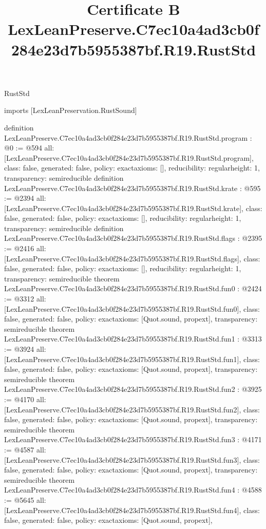 \begin{lexlean}{RustStd}
\title{Certificate B LexLeanPreserve.C7ec10a4ad3cb0f284e23d7b5955387bf.R19.RustStd}
\begin{coremodule}
imports [LexLeanPreservation.RustSound]

definition LexLeanPreserve.C7ec10a4ad3cb0f284e23d7b5955387bf.R19.RustStd.program : @0 := @594 {
  all: [LexLeanPreserve.C7ec10a4ad3cb0f284e23d7b5955387bf.R19.RustStd.program],
  class: false,
  generated: false,
  policy: exact{axioms: []},
  reducibility: regular{height: 1},
  transparency: semireducible
}
definition LexLeanPreserve.C7ec10a4ad3cb0f284e23d7b5955387bf.R19.RustStd.krate : @595 := @2394 {
  all: [LexLeanPreserve.C7ec10a4ad3cb0f284e23d7b5955387bf.R19.RustStd.krate],
  class: false,
  generated: false,
  policy: exact{axioms: []},
  reducibility: regular{height: 1},
  transparency: semireducible
}
definition LexLeanPreserve.C7ec10a4ad3cb0f284e23d7b5955387bf.R19.RustStd.flags : @2395 := @2416 {
  all: [LexLeanPreserve.C7ec10a4ad3cb0f284e23d7b5955387bf.R19.RustStd.flags],
  class: false,
  generated: false,
  policy: exact{axioms: []},
  reducibility: regular{height: 1},
  transparency: semireducible
}
theorem LexLeanPreserve.C7ec10a4ad3cb0f284e23d7b5955387bf.R19.RustStd.fun0 : @2424 := @3312 {
  all: [LexLeanPreserve.C7ec10a4ad3cb0f284e23d7b5955387bf.R19.RustStd.fun0],
  class: false,
  generated: false,
  policy: exact{axioms: [Quot.sound, propext]},
  transparency: semireducible
}
theorem LexLeanPreserve.C7ec10a4ad3cb0f284e23d7b5955387bf.R19.RustStd.fun1 : @3313 := @3924 {
  all: [LexLeanPreserve.C7ec10a4ad3cb0f284e23d7b5955387bf.R19.RustStd.fun1],
  class: false,
  generated: false,
  policy: exact{axioms: [Quot.sound, propext]},
  transparency: semireducible
}
theorem LexLeanPreserve.C7ec10a4ad3cb0f284e23d7b5955387bf.R19.RustStd.fun2 : @3925 := @4170 {
  all: [LexLeanPreserve.C7ec10a4ad3cb0f284e23d7b5955387bf.R19.RustStd.fun2],
  class: false,
  generated: false,
  policy: exact{axioms: [Quot.sound, propext]},
  transparency: semireducible
}
theorem LexLeanPreserve.C7ec10a4ad3cb0f284e23d7b5955387bf.R19.RustStd.fun3 : @4171 := @4587 {
  all: [LexLeanPreserve.C7ec10a4ad3cb0f284e23d7b5955387bf.R19.RustStd.fun3],
  class: false,
  generated: false,
  policy: exact{axioms: [Quot.sound, propext]},
  transparency: semireducible
}
theorem LexLeanPreserve.C7ec10a4ad3cb0f284e23d7b5955387bf.R19.RustStd.fun4 : @4588 := @5645 {
  all: [LexLeanPreserve.C7ec10a4ad3cb0f284e23d7b5955387bf.R19.RustStd.fun4],
  class: false,
  generated: false,
  policy: exact{axioms: [Quot.sound, propext]},
}
\end{coremodule}
\end{lexlean}
